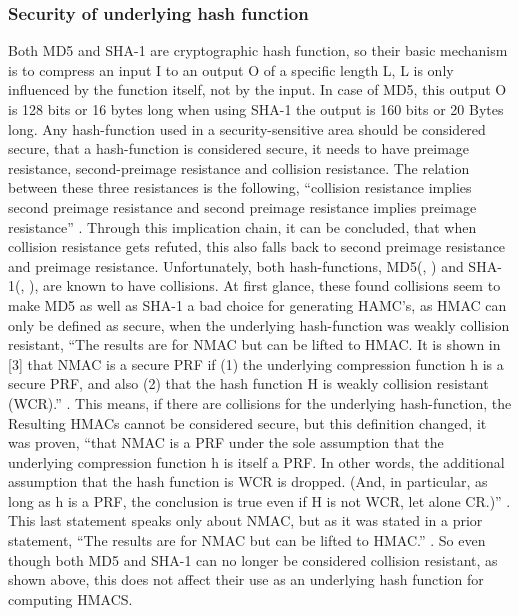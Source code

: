 \subsubsection{Security of underlying hash function}
Both MD5 and SHA-1 are cryptographic hash function, so their basic mechanism is to compress an input I to an output O of a specific length L, L is only influenced by the function itself, not by the input. In case of MD5, this output O is 128 bits or 16 bytes \cite{BAV} long when using SHA-1 the output is 160 bits or 20 Bytes \cite{BAV} long. Any hash-function used in a security-sensitive area should be considered secure, that a hash-function is considered secure, it needs to have preimage resistance, second-preimage resistance and collision resistance. The relation between these three resistances is the following, “collision resistance implies second preimage resistance and second preimage resistance implies preimage resistance” \cite{SPR-res}. Through this implication chain, it can be concluded, that when collision resistance gets refuted, this also falls back to second preimage resistance and preimage resistance. Unfortunately, both hash-functions, MD5(\cite{COL1}, \cite{COL2}) and SHA-1(\cite{COL3}, \cite{COL4}), are known to have collisions. At first glance, these found collisions seem to make MD5 as well as SHA-1 a bad choice for generating HAMC's, as HMAC can only be defined as secure, when the underlying hash-function was weakly collision resistant, “The results are for NMAC but can be lifted to HMAC. It is shown in [3] that NMAC is a secure PRF if (1) the underlying compression function h is a secure PRF, and also (2) that the hash function H is weakly collision resistant (WCR).” \cite{HMAC-SEC1}. This means, if there are collisions for the underlying hash-function, the Resulting HMACs cannot be considered secure, but this definition changed, it was proven, “that NMAC is a PRF under the sole assumption that the underlying compression function h is itself a PRF. In other words, the additional assumption that the hash function is WCR is dropped. (And, in particular, as long as h is a PRF, the conclusion is true even if H is not WCR, let alone CR.)” \cite{HMAC-SEC1}. This last statement speaks only about NMAC, but as it was stated in a prior statement, “The results are for NMAC but can be lifted to HMAC.” \cite{HMAC-SEC1}. So even though both MD5 and SHA-1 can no longer be considered collision resistant, as shown above, this does not affect their use as an underlying hash function for computing HMACS. 
